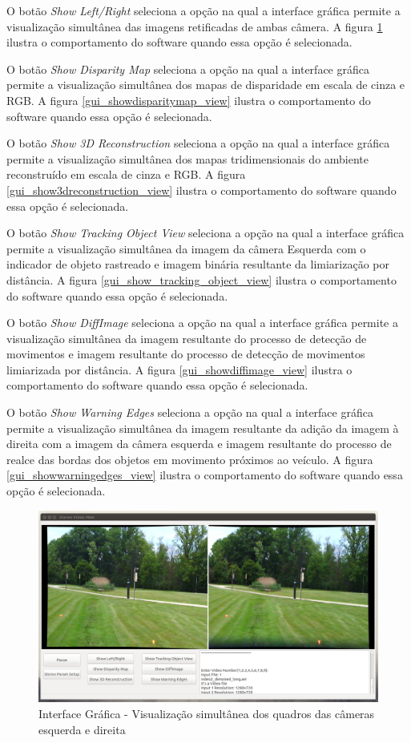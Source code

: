 O botão \textit{Show Left/Right} seleciona a opção na qual a interface gráfica permite a visualização simultânea das imagens retificadas de ambas câmera. A figura \ref{gui_showleftright_view} 
ilustra o comportamento do software quando essa opção é selecionada. 

O botão \textit{Show Disparity Map} seleciona a opção na qual a interface gráfica permite a visualização simultânea dos mapas de disparidade em escala de cinza e RGB. A figura 
\ref{gui_showdisparitymap_view} ilustra o comportamento do software quando essa opção é selecionada. 

O botão \textit{Show 3D Reconstruction} seleciona a opção na qual a interface gráfica permite a visualização simultânea dos mapas tridimensionais do ambiente reconstruído em escala de cinza e 
RGB. A figura \ref{gui_show3dreconstruction_view} ilustra o comportamento do software quando essa opção é selecionada. 

O botão \textit{Show Tracking Object View} seleciona a opção na qual a interface gráfica permite a visualização simultânea da imagem da câmera Esquerda com o indicador de objeto rastreado e 
imagem binária resultante da limiarização por distância. A figura \ref{gui_show_tracking_object_view} ilustra o comportamento do software quando essa opção é selecionada. 

O botão \textit{Show DiffImage} seleciona a opção na qual a interface gráfica permite a visualização simultânea da imagem resultante do processo de detecção de movimentos e imagem resultante do 
processo de detecção de movimentos limiarizada por distância. A figura \ref{gui_showdiffimage_view} ilustra o comportamento do software quando essa opção é selecionada. 

O botão \textit{Show Warning Edges} seleciona a opção na qual a interface gráfica permite a visualização simultânea da imagem resultante da adição da imagem à direita com a imagem da câmera esquerda e imagem resultante do processo de realce das bordas dos objetos em movimento próximos ao veículo. A figura \ref{gui_showwarningedges_view} ilustra o comportamento do software quando essa opção é selecionada. 


\begin{figure}[H]
 	\centering
 	\includegraphics[scale=0.35]{./Resources/gui_showleftright_view.png}
 	\caption{Interface Gráfica - Visualização simultânea dos quadros das câmeras esquerda e direita}
 	\label{gui_showleftright_view}
\end{figure}


